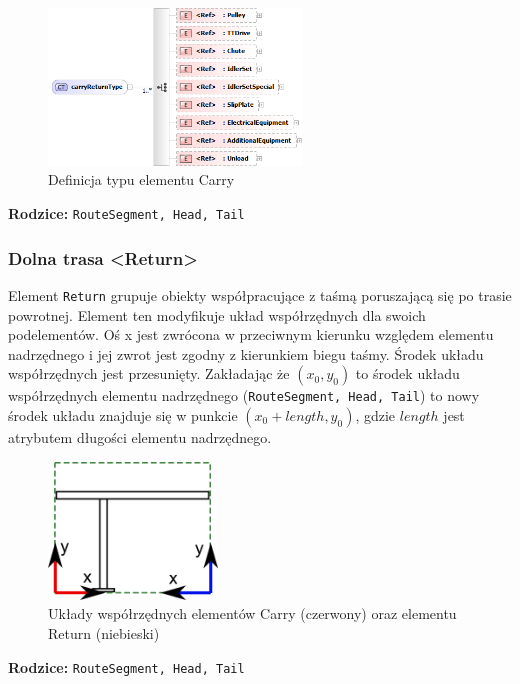 \documentclass[12pt,a4paper]{article}
\begin{document}
\begin{figure}[H]
  \centering
  \includegraphics[width=0.6\textwidth]{png/liquid/carryReturnType}
  \caption{Definicja typu elementu Carry}
  \label{fig:carryReturnType-xsd}
\end{figure}

\noindent\textbf{Rodzice:} \texttt{RouteSegment, Head, Tail}


\subsubsection{Dolna trasa <Return>}
Element {\tt Return} grupuje obiekty współpracujące z taśmą poruszającą się po
trasie powrotnej.  Element ten modyfikuje układ współrzędnych dla swoich
podelementów.  Oś x jest zwrócona w przeciwnym kierunku względem elementu
nadrzędnego i jej zwrot jest zgodny z kierunkiem biegu taśmy.  Środek układu
współrzędnych jest przesunięty.  Zakładając że $(x_0, y_0)$ to środek układu
współrzędnych elementu nadrzędnego ({\tt RouteSegment, Head, Tail}) to nowy
środek układu znajduje się w punkcie $(x_0 + {length}, y_0)$, gdzie ${length}$
jest atrybutem długości elementu nadrzędnego.

\begin{figure}[H]
  \centering
  \includegraphics[width=0.4\textwidth]{png/carryReturn_drw}
  \caption{Układy współrzędnych elementów Carry (czerwony) oraz
elementu Return (niebieski)}
  \label{fig:carryReturn-drw}
\end{figure}

\noindent\textbf{Rodzice:} \texttt{RouteSegment, Head, Tail}
\end{document}
